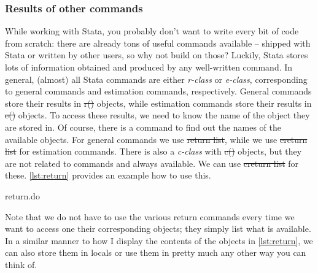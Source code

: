 \subsubsection{Results of other commands}
While working with Stata,
you probably don't want to write every bit of code from scratch:
there are already tons of useful commands available -- shipped with Stata or written by other users, so why not build on those?
Luckily,
Stata stores lots of information obtained and produced by any well-written command.
In general, (almost) all Stata commands are either \emph{r-class} or \emph{e-class},
corresponding to general commands and estimation commands, respectively.
General commands store their results in \st{r()} objects,
while estimation commands store their results in \st{e()} objects.
To access these results, we need to know the name of the object they are stored in.
Of course, there is a command to find out the names of the available objects.
For general commands we use \st{return list}, while we use \st{ereturn list} for estimation commands.
There is also a \emph{c-class} with \st{c()} objects,
but they are not related to commands and always available.
We can use \st{creturn list} for these.
\cref{lst:return} provides an example how to use this.

\begin{listing}[htp]
    \caption{return.do}\label{lst:return}
\end{listing}

Note that we do not have to use the various return commands every time we want to access one their corresponding objects;
they simply list what is available.
In a similar manner to how I display the contents of the objects in \cref{lst:return},
we can also store them in locals or use them in pretty much any other way you can think of.
